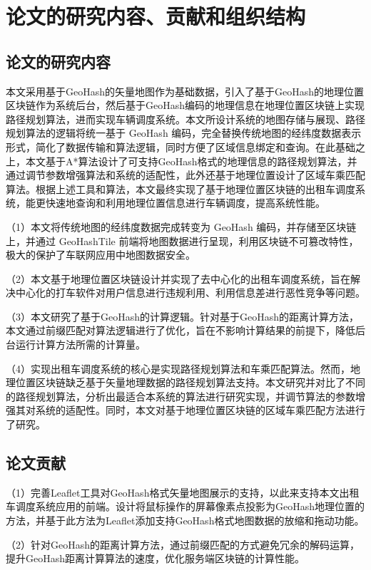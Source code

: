 \section{论文的研究内容、贡献和组织结构}
\subsection{论文的研究内容}

本文采用基于GeoHash的矢量地图作为基础数据，引入了基于GeoHash的地理位置区块链作为系统后台，然后基于GeoHash编码的地理信息在地理位置区块链上实现路径规划算法，进而实现车辆调度系统。本文所设计系统的地图存储与展现、路径规划算法的逻辑将统一基于 GeoHash 编码，完全替换传统地图的经纬度数据表示形式，简化了数据传输和算法逻辑，同时方便了区域信息绑定和查询。在此基础之上，本文基于A*算法设计了可支持GeoHash格式的地理信息的路径规划算法，并通过调节参数增强算法和系统的适配性，此外还基于地理位置设计了区域车乘匹配算法。根据上述工具和算法，本文最终实现了基于地理位置区块链的出租车调度系统，能更快速地查询和利用地理位置信息进行车辆调度，提高系统性能。

（1）本文将传统地图的经纬度数据完成转变为 GeoHash 编码，并存储至区块链上，并通过 GeoHashTile 前端将地图数据进行呈现，利用区块链不可篡改特性，极大的保护了车联网应用中地图数据安全。

（2）本文基于地理位置区块链设计并实现了去中心化的出租车调度系统，旨在解决中心化的打车软件对用户信息进行违规利用、利用信息差进行恶性竞争等问题。

（3）本文研究了基于GeoHash的计算逻辑。针对基于GeoHash的距离计算方法，本文通过前缀匹配对算法逻辑进行了优化，旨在不影响计算结果的前提下，降低后台运行计算方法所需的计算量。

（4）实现出租车调度系统的核心是实现路径规划算法和车乘匹配算法。然而，地理位置区块链缺乏基于矢量地理数据的路径规划算法支持。本文研究并对比了不同的路径规划算法，分析出最适合本系统的算法进行研究实现，并调节算法的参数增强其对系统的适配性。同时，本文对基于地理位置区块链的区域车乘匹配方法进行了研究。

\subsection{论文贡献}
（1）完善Leaflet工具对GeoHash格式矢量地图展示的支持，以此来支持本文出租车调度系统应用的前端。设计将鼠标操作的屏幕像素点投影为GeoHash地理位置的方法，并基于此方法为Leaflet添加支持GeoHash格式地图数据的放缩和拖动功能。

（2）针对GeoHash的距离计算方法，通过前缀匹配的方式避免冗余的解码运算，提升GeoHash距离计算算法的速度，优化服务端区块链的计算性能。

